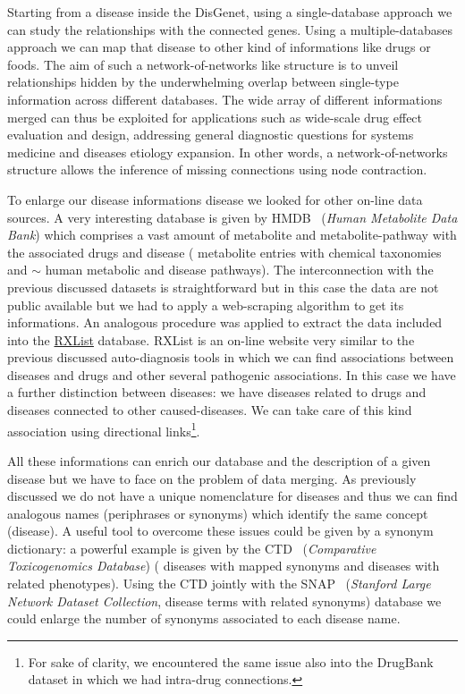 \documentclass{standalone}
\begin{document}
Starting from a disease inside the DisGenet, using a single-database approach we can study the  relationships with the connected genes.
Using a multiple-databases approach we can map that disease to other kind of informations like drugs or foods.
The aim of such a network-of-networks like structure is to unveil relationships hidden by the underwhelming overlap between single-type information across different databases.
The wide array of different informations merged can thus be exploited for applications such as wide-scale drug effect evaluation and design, addressing general diagnostic questions for systems medicine and diseases etiology expansion.
In other words, a network-of-networks structure allows the inference of missing connections using node contraction.

To enlarge our disease informations disease we looked for other on-line data sources.
A very interesting database is given by HMDB~\cite{HMDB} (\emph{Human Metabolite Data Bank}) which comprises a vast amount of metabolite and metabolite-pathway with the associated drugs and disease ( metabolite entries with chemical taxonomies and $\sim$ human metabolic and disease pathways).
The interconnection with the previous discussed datasets is straightforward but in this case the data are not public available but we had to apply a web-scraping algorithm to get its informations.
An analogous procedure was applied to extract the data included into the \href{https://www.rxlist.com/script/main/hp.asp}{RXList} database.
RXList is an on-line website very similar to the previous discussed auto-diagnosis tools in which we can find associations between diseases and drugs and other several pathogenic associations.
In this case we have a further distinction between diseases: we have diseases related to drugs and diseases connected to other caused-diseases.
We can take care of this kind association using directional links\footnote{
  For sake of clarity, we encountered the same issue also into the DrugBank dataset in which we had intra-drug connections.
}.

All these informations can enrich our database and the description of a given disease but we have to face on the problem of data merging.
As previously discussed we do not have a unique nomenclature for diseases and thus we can find analogous names (periphrases or synonyms) which identify the same concept (disease).
A useful tool to overcome these issues could be given by a synonym dictionary: a powerful example is given by the CTD~\cite{CTDdb} (\emph{Comparative Toxicogenomics Database}) ( diseases with mapped synonyms and  diseases with related phenotypes).
Using the CTD jointly with the SNAP~\cite{biosnapnets} (\emph{Stanford Large Network Dataset Collection},  disease terms with related synonyms) database we could enlarge the number of synonyms associated to each disease name.
\end{document}

